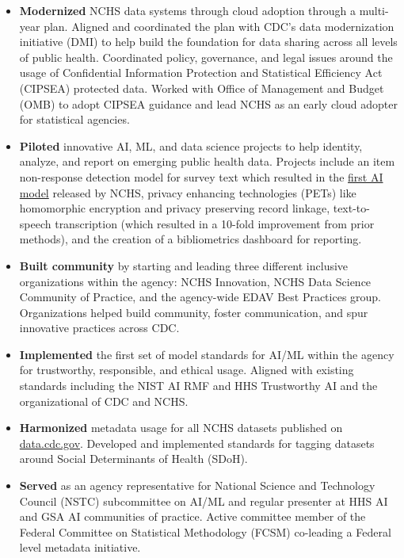 \documentclass[]{scrartcl}
\begin{document}
\begin{cleanCV}
{\begin{itemize}
  \item \textbf{Modernized} NCHS data systems through cloud adoption through a multi-year plan. Aligned and coordinated the plan with CDC's data modernization initiative (DMI) to help build the foundation for data sharing across all levels of public health. Coordinated policy, governance, and legal issues around the usage of Confidential Information Protection and Statistical Efficiency Act (CIPSEA) protected data. Worked with Office of Management and Budget (OMB) to adopt CIPSEA guidance and lead NCHS as an early cloud adopter for statistical agencies.
    
  \item \textbf{Piloted} innovative AI, ML, and data science projects to help identity, analyze, and report on emerging public health data. Projects include an item non-response detection model for survey text which resulted in the \href{https://www.cdc.gov/nchs/data-science/SANDS-model-context.htm}{first AI model} released by NCHS, privacy enhancing technologies (PETs) like homomorphic encryption and privacy preserving record linkage, text-to-speech transcription (which resulted in a 10-fold improvement from prior methods), and the creation of a bibliometrics dashboard for reporting.

      \item \textbf{Built community} by starting and leading three different inclusive organizations within the agency: NCHS Innovation, NCHS Data Science Community of Practice, and the agency-wide EDAV Best Practices group. Organizations helped build community, foster communication, and spur innovative practices across CDC.
    
  \item \textbf{Implemented} the first set of model standards for AI/ML within the agency for trustworthy, responsible, and ethical usage. Aligned with existing standards including the NIST AI RMF and HHS Trustworthy AI and the organizational of CDC and NCHS. 

  \item \textbf{Harmonized} metadata usage for all NCHS datasets published on \href{https://data.cdc.gov/browse?category=NCHS}{data.cdc.gov}. Developed and implemented standards for tagging datasets around Social Determinants of Health (SDoH).
    
      \item \textbf{Served} as an agency representative for National Science and Technology Council (NSTC) subcommittee on AI/ML and regular presenter at HHS AI and GSA AI communities of practice. Active committee member of the Federal Committee on Statistical Methodology (FCSM) co-leading a Federal level metadata initiative.


\end{itemize}}
\end{cleanCV}
\end{document}
